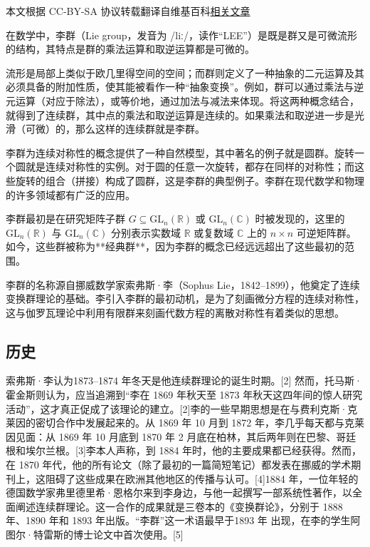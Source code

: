 
本文根据 CC-BY-SA 协议转载翻译自维基百科\href{https://en.wikipedia.org/wiki/Lie_group}{相关文章}

在数学中，李群（Lie group，发音为 /liː/，读作“LEE”）是既是群又是可微流形的结构，其特点是群的乘法运算和取逆运算都是可微的。

流形是局部上类似于欧几里得空间的空间；而群则定义了一种抽象的二元运算及其必须具备的附加性质，使其能被看作一种“抽象变换”。例如，群可以通过乘法与逆元运算（对应于除法），或等价地，通过加法与减法来体现。将这两种概念结合，就得到了连续群，其中点的乘法和取逆运算是连续的。如果乘法和取逆进一步是光滑（可微）的，那么这样的连续群就是李群。

李群为连续对称性的概念提供了一种自然模型，其中著名的例子就是圆群。旋转一个圆就是连续对称性的实例。对于圆的任意一次旋转，都存在同样的对称性；而这些旋转的组合（拼接）构成了圆群，这是李群的典型例子。李群在现代数学和物理的许多领域都有广泛的应用。

李群最初是在研究矩阵子群
$G \subseteq \mathrm{GL}_n(\mathbb{R})$ 或 $\mathrm{GL}_n(\mathbb{C})$ 时被发现的，这里的 $\mathrm{GL}_n(\mathbb{R})$ 与 $\mathrm{GL}_n(\mathbb{C})$ 分别表示实数域 $\mathbb{R}$ 或复数域 $\mathbb{C}$ 上的 $n \times n$ 可逆矩阵群。如今，这些群被称为**经典群**，因为李群的概念已经远远超出了这些最初的范围。

李群的名称源自挪威数学家索弗斯·李（Sophus Lie，1842–1899），他奠定了连续变换群理论的基础。李引入李群的最初动机，是为了刻画微分方程的连续对称性，这与伽罗瓦理论中利用有限群来刻画代数方程的离散对称性有着类似的思想。
\subsection{历史}
索弗斯·李认为1873–1874 年冬天是他连续群理论的诞生时期。[2] 然而，托马斯·霍金斯则认为，应当追溯到“李在 1869 年秋天至 1873 年秋天这四年间的惊人研究活动”，这才真正促成了该理论的建立。[2]李的一些早期思想是在与费利克斯·克莱因的密切合作中发展起来的。从 1869 年 10 月到 1872 年，李几乎每天都与克莱因见面：从 1869 年 10 月底到 1870 年 2 月底在柏林，其后两年则在巴黎、哥廷根和埃尔兰根。[3]李本人声称，到 1884 年时，他的主要成果都已经获得。然而，在 1870 年代，他的所有论文（除了最初的一篇简短笔记）都发表在挪威的学术期刊上，这阻碍了这些成果在欧洲其他地区的传播与认可。[4]1884 年，一位年轻的德国数学家弗里德里希·恩格尔来到李身边，与他一起撰写一部系统性著作，以全面阐述连续群理论。这一合作的成果就是三卷本的《变换群论》，分别于 1888 年、1890 年和 1893 年出版。“李群”这一术语最早于1893 年 出现，在李的学生阿图尔·特雷斯的博士论文中首次使用。[5]
